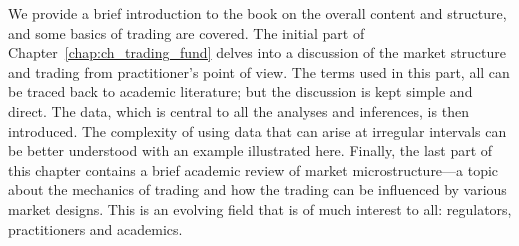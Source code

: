 
We provide a brief introduction to the book on the overall content and structure, and some basics of trading are covered. The initial part of Chapter~\ref{chap:ch_trading_fund} delves into a discussion of the market structure and trading from practitioner's point of view. The terms used in this part, all can be traced back to academic literature; but the discussion is kept simple and direct. The data, which is central to all the analyses and inferences, is then introduced. The complexity of using data that can arise at irregular intervals can be better understood with an example illustrated here. Finally, the last part of this chapter contains a brief academic review of market microstructure---a topic about the mechanics of trading and how the trading can be influenced by various market designs. This is an evolving field that is of much interest to all: regulators, practitioners and academics. 